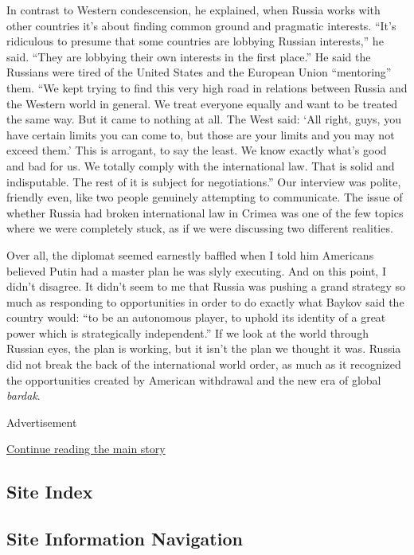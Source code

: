 In contrast to Western condescension, he explained, when Russia works
with other countries it's about finding common ground and pragmatic
interests. ``It's ridiculous to presume that some countries are lobbying
Russian interests,'' he said. ``They are lobbying their own interests in
the first place.'' He said the Russians were tired of the United States
and the European Union ``mentoring'' them. ``We kept trying to find this
very high road in relations between Russia and the Western world in
general. We treat everyone equally and want to be treated the same way.
But it came to nothing at all. The West said: `All right, guys, you have
certain limits you can come to, but those are your limits and you may
not exceed them.' This is arrogant, to say the least. We know exactly
what's good and bad for us. We totally comply with the international
law. That is solid and indisputable. The rest of it is subject for
negotiations.'' Our interview was polite, friendly even, like two people
genuinely attempting to communicate. The issue of whether Russia had
broken international law in Crimea was one of the few topics where we
were completely stuck, as if we were discussing two different realities.

Over all, the diplomat seemed earnestly baffled when I told him
Americans believed Putin had a master plan he was slyly executing. And
on this point, I didn't disagree. It didn't seem to me that Russia was
pushing a grand strategy so much as responding to opportunities in order
to do exactly what Baykov said the country would: ``to be an autonomous
player, to uphold its identity of a great power which is strategically
independent.'' If we look at the world through Russian eyes, the plan is
working, but it isn't the plan we thought it was. Russia did not break
the back of the international world order, as much as it recognized the
opportunities created by American withdrawal and the new era of global
\emph{bardak}.

Advertisement

\protect\hyperlink{after-bottom}{Continue reading the main story}

\hypertarget{site-index}{%
\subsection{Site Index}\label{site-index}}

\hypertarget{site-information-navigation}{%
\subsection{Site Information
Navigation}\label{site-information-navigation}}

